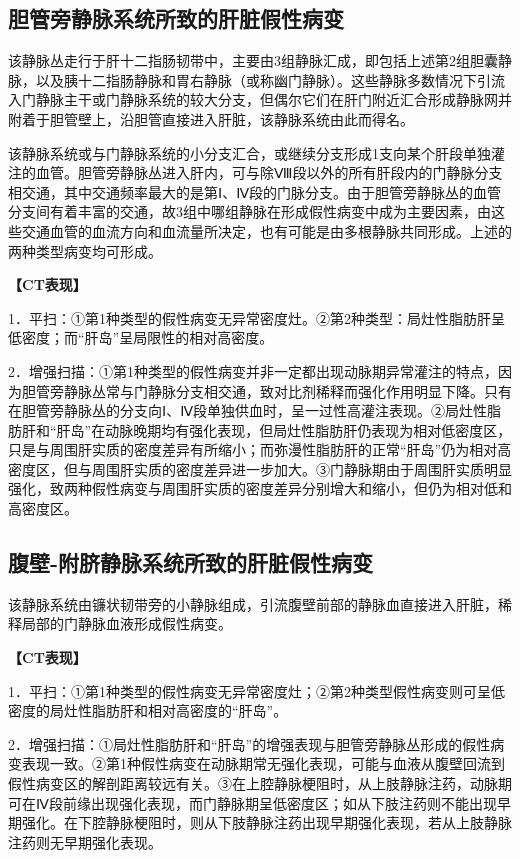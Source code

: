 \subsection{胆管旁静脉系统所致的肝脏假性病变}

该静脉丛走行于肝十二指肠韧带中，主要由3组静脉汇成，即包括上述第2组胆囊静脉，以及胰十二指肠静脉和胃右静脉（或称幽门静脉）。这些静脉多数情况下引流入门静脉主干或门静脉系统的较大分支，但偶尔它们在肝门附近汇合形成静脉网并附着于胆管壁上，沿胆管直接进入肝脏，该静脉系统由此而得名。

该静脉系统或与门静脉系统的小分支汇合，或继续分支形成1支向某个肝段单独灌注的血管。胆管旁静脉丛进入肝内，可与除Ⅷ段以外的所有肝段内的门静脉分支相交通，其中交通频率最大的是第Ⅰ、Ⅳ段的门脉分支。由于胆管旁静脉丛的血管分支间有着丰富的交通，故3组中哪组静脉在形成假性病变中成为主要因素，由这些交通血管的血流方向和血流量所决定，也有可能是由多根静脉共同形成。上述的两种类型病变均可形成。

\textbf{【CT表现】}

1．平扫：①第1种类型的假性病变无异常密度灶。②第2种类型：局灶性脂肪肝呈低密度；而“肝岛”呈局限性的相对高密度。

2．增强扫描：①第1种类型的假性病变并非一定都出现动脉期异常灌注的特点，因为胆管旁静脉丛常与门静脉分支相交通，致对比剂稀释而强化作用明显下降。只有在胆管旁静脉丛的分支向Ⅰ、Ⅳ段单独供血时，呈一过性高灌注表现。②局灶性脂肪肝和“肝岛”在动脉晚期均有强化表现，但局灶性脂肪肝仍表现为相对低密度区，只是与周围肝实质的密度差异有所缩小；而弥漫性脂肪肝的正常“肝岛”仍为相对高密度区，但与周围肝实质的密度差异进一步加大。③门静脉期由于周围肝实质明显强化，致两种假性病变与周围肝实质的密度差异分别增大和缩小，但仍为相对低和高密度区。

\subsection{腹壁-附脐静脉系统所致的肝脏假性病变}

该静脉系统由镰状韧带旁的小静脉组成，引流腹壁前部的静脉血直接进入肝脏，稀释局部的门静脉血液形成假性病变。

\textbf{【CT表现】}

1．平扫：①第1种类型的假性病变无异常密度灶；②第2种类型假性病变则可呈低密度的局灶性脂肪肝和相对高密度的“肝岛”。

2．增强扫描：①局灶性脂肪肝和“肝岛”的增强表现与胆管旁静脉丛形成的假性病变表现一致。②第1种假性病变在动脉期常无强化表现，可能与血液从腹壁回流到假性病变区的解剖距离较远有关。③在上腔静脉梗阻时，从上肢静脉注药，动脉期可在Ⅳ段前缘出现强化表现，而门静脉期呈低密度区；如从下肢注药则不能出现早期强化。在下腔静脉梗阻时，则从下肢静脉注药出现早期强化表现，若从上肢静脉注药则无早期强化表现。

